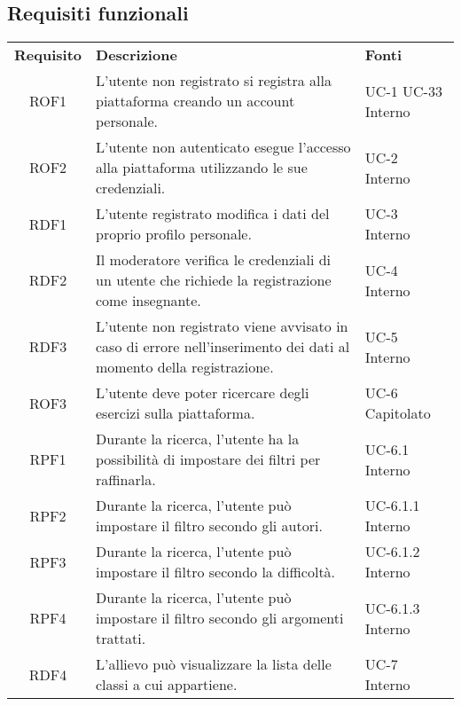 \subsection{Requisiti funzionali}
\begin{tabularx}{\textwidth}{| c | p{10cm} | X |}
		\rowcolor{LightBlue}
		\color{white}\bfseries Requisito & \color{white}\bfseries Descrizione & \color{white}\bfseries Fonti\\[0.25cm]
		ROF1 & L'utente non registrato si registra alla piattaforma creando un account personale. & UC-1 \newline UC-33 \newline Interno\\
		ROF2 & L'utente non autenticato esegue l'accesso alla piattaforma utilizzando le sue credenziali. & UC-2 \newline Interno\\
		RDF1 & L'utente registrato modifica i dati del proprio profilo personale. & UC-3 \newline Interno\\
		RDF2 & Il moderatore verifica le credenziali di un utente che richiede la registrazione come insegnante. & UC-4 \newline Interno\\
		RDF3 & L'utente non registrato viene avvisato in caso di errore nell'inserimento dei dati al momento della registrazione. & UC-5 \newline Interno\\
		ROF3 & L'utente deve poter ricercare degli esercizi sulla piattaforma. & UC-6 \newline Capitolato\\
		RPF1 & Durante la ricerca, l'utente ha la possibilità di impostare dei filtri per raffinarla. & UC-6.1 \newline Interno\\
		RPF2 & Durante la ricerca, l'utente può impostare il filtro secondo gli autori. & UC-6.1.1 \newline Interno\\
		RPF3 & Durante la ricerca, l'utente può impostare il filtro secondo la difficoltà. & UC-6.1.2 \newline Interno\\
		RPF4 & Durante la ricerca, l'utente può impostare il filtro secondo gli argomenti trattati. & UC-6.1.3 \newline Interno\\
		RDF4 & L'allievo può visualizzare la lista delle classi a cui appartiene. & UC-7 \newline Interno\\

\end{tabularx}
